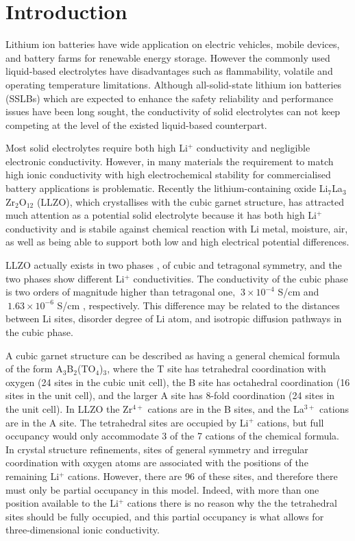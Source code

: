\documentclass[twoside,twocolumn,9pt]{article}
\begin{document}

\section{Introduction}

Lithium ion batteries have wide application on electric vehicles, mobile devices, and battery
farms for renewable energy storage.  However the commonly used liquid-based electrolytes have
disadvantages such as flammability, volatile  and operating temperature limitations.
Although all-solid-state lithium ion batteries (SSLBs) which are expected to enhance the safety
reliability and performance issues have been long sought, the conductivity of solid electrolytes can not
keep competing at the level of the existed liquid-based counterpart.

Most solid electrolytes require both high Li$^+$ conductivity and negligible electronic
conductivity. However, in many materials the requirement to match high ionic conductivity with high electrochemical stability for commercialised battery applications is problematic. Recently the lithium-containing oxide  Li$_7$La$_3$Zr$_2$O$_{12}$ (LLZO)\cite{Murugan:2007eg, Samson:2019eo, Kataoka:2020bg}, which crystallises with the cubic garnet structure, has attracted much attention as a potential solid electrolyte because it has both high Li$^+$ conductivity and is stabile against chemical
reaction with Li metal, moisture, air, as well as being able to support both low and high electrical potential differences.

LLZO actually exists in two phases \cite{Geiger:2011cg}, of
cubic and tetragonal symmetry, and the two phases show different Li$^+$ conductivities. The conductivity of the cubic
phase is two orders of magnitude higher than tetragonal one, $~3\times 10^{-4}$ S/cm \cite{Murugan:2007eg}
and $~1.63\times 10^{-6}$ S/cm \cite{Awaka:2009jv}, respectively.
This difference may be related to the distances between Li sites, disorder degree of Li atom, and isotropic diffusion pathways in the cubic phase.

A cubic garnet structure can be described \cite{Cussen:2011dg} as having a general chemical formula of the form A$_3$B$_2$(TO$_4$)$_3$, where the T site has tetrahedral coordination with oxygen (24 sites in the cubic unit cell), the B site has octahedral coordination (16 sites in the unit cell), and the larger A site has 8-fold coordination (24 sites in the unit cell). In LLZO the Zr$^{4+}$ cations are in the B sites, and the La$^{3+}$ cations are in the A site. The tetrahedral sites are occupied by Li$^+$ cations, but full occupancy would only accommodate 3 of the 7 cations of the chemical formula. In crystal structure refinements, sites of general symmetry and irregular coordination with oxygen atoms are associated with the positions of the remaining Li$^+$ cations. However, there are 96 of these sites, and therefore there must only be partial occupancy in this model. Indeed, with more than one position available to the Li$^+$ cations there is no reason why the the tetrahedral sites should be fully occupied, and this partial occupancy is what allows for three-dimensional ionic conductivity.
\end{document}

